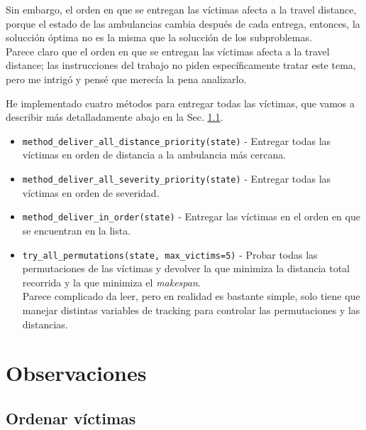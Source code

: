 Sin embargo, el orden en que se entregan las víctimas afecta a la travel distance, porque el estado de las ambulancias cambia después de cada entrega, entonces, la solucción óptima no es la misma que la solucción de los subproblemas.\\
Parece claro que el orden en que se entregan las víctimas afecta a la travel distance;
las instrucciones del trabajo no piden específicamente tratar este tema, pero me intrigó y pensé que merecía la pena analizarlo.

He implementado cuatro métodos para entregar todas las víctimas, que vamos a describir más detalladamente abajo en la Sec. \ref{sec:ordenar_victimas}.
\begin{itemize}
   \item \lstinline|method_deliver_all_distance_priority(state)| - Entregar todas las víctimas en orden de distancia a la ambulancia más cercana.
   \item \lstinline|method_deliver_all_severity_priority(state)| - Entregar todas las víctimas en orden de severidad.
   \item \lstinline|method_deliver_in_order(state)| - Entregar las víctimas en el orden en que se encuentran en la lista.
   \item \lstinline|try_all_permutations(state, max_victims=5)| - Probar todas las permutaciones de las víctimas y devolver la que minimiza la distancia total recorrida y la que minimiza el \textit{makespan}.\\
   Parece complicado da leer, pero en realidad es bastante simple, solo tiene que manejar distintas variables de tracking para controlar las permutaciones y las distancias.
\end{itemize}

\section{Observaciones}

\subsection{Ordenar víctimas}
\label{sec:ordenar_victimas}

